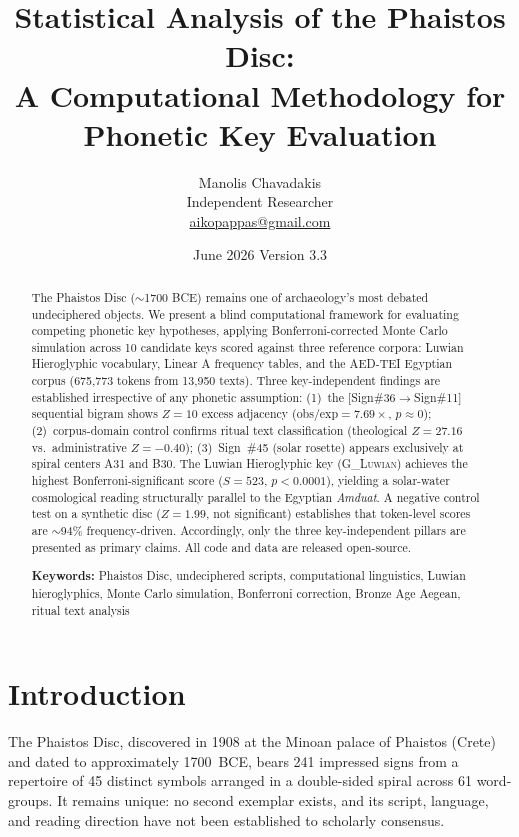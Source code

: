 \documentclass[12pt,a4paper]{article}
\title{Statistical Analysis of the Phaistos Disc:\\
A Computational Methodology for Phonetic Key Evaluation}
\author{Manolis Chavadakis\\
\small Independent Researcher\\
\small \href{mailto:aikopappas@gmail.com}{aikopappas@gmail.com}}
\date{June 2026 \quad Version 3.3}
\begin{document}
\maketitle

\begin{abstract}
The Phaistos Disc ($\sim$1700 BCE) remains one of archaeology's most debated undeciphered objects. We present a blind computational framework for evaluating competing phonetic key hypotheses, applying Bonferroni-corrected Monte Carlo simulation across 10 candidate keys scored against three reference corpora: Luwian Hieroglyphic vocabulary, Linear A frequency tables, and the AED-TEI Egyptian corpus (675,773 tokens from 13,950 texts). Three key-independent findings are established irrespective of any phonetic assumption: (1)~the [Sign\#36$\to$Sign\#11] sequential bigram shows $Z=10$ excess adjacency (obs/exp$=7.69\times$, $p\approx 0$); (2)~corpus-domain control confirms ritual text classification (theological $Z=27.16$ vs.\ administrative $Z=-0.40$); (3)~Sign~\#45 (solar rosette) appears exclusively at spiral centers A31 and B30. The Luwian Hieroglyphic key (\textsc{G\_Luwian}) achieves the highest Bonferroni-significant score ($S=523$, $p<0.0001$), yielding a solar-water cosmological reading structurally parallel to the Egyptian \textit{Amduat}. A negative control test on a synthetic disc ($Z=1.99$, not significant) establishes that token-level scores are $\sim$94\% frequency-driven. Accordingly, only the three key-independent pillars are presented as primary claims. All code and data are released open-source.

\medskip
\noindent\textbf{Keywords:} Phaistos Disc, undeciphered scripts, computational linguistics, Luwian hieroglyphics, Monte Carlo simulation, Bonferroni correction, Bronze Age Aegean, ritual text analysis
\end{abstract}

\tableofcontents
\newpage

\section{Introduction}

The Phaistos Disc, discovered in 1908 at the Minoan palace of Phaistos (Crete) and dated to approximately 1700~BCE, bears 241 impressed signs from a repertoire of 45 distinct symbols arranged in a double-sided spiral across 61 word-groups. It remains unique: no second exemplar exists, and its script, language, and reading direction have not been established to scholarly consensus.
\end{document}
